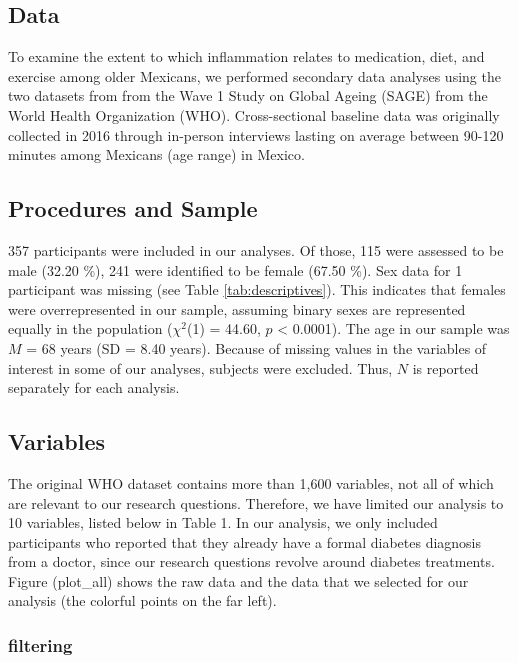 \documentclass[
  man]{apa6}
\begin{document}
\hypertarget{data}{%
\subsection{Data}\label{data}}

To examine the extent to which inflammation relates to medication, diet, and exercise among older Mexicans, we performed secondary data analyses using the two datasets from from the Wave 1 Study on Global Ageing (SAGE) from the World Health Organization (WHO). Cross-sectional baseline data was originally collected in 2016 through in-person interviews lasting on average between 90-120 minutes among Mexicans (age range) in Mexico.

\hypertarget{procedures-and-sample}{%
\subsection{Procedures and Sample}\label{procedures-and-sample}}

357 participants were included in our analyses. Of those, 115 were assessed to be male (32.20 \%), 241 were identified to be female (67.50 \%). Sex data for 1 participant was missing (see Table \ref{tab:descriptives}). This indicates that females were overrepresented in our sample, assuming binary sexes are represented equally in the population (\(\chi^2\)(1) = 44.60, \(p\) \textless{} 0.0001). The age in our sample was \(M\) = 68 years (SD = 8.40 years).
Because of missing values in the variables of interest in some of our analyses, subjects were excluded. Thus, \(N\) is reported separately for each analysis.

\hypertarget{variables}{%
\subsection{Variables}\label{variables}}

The original WHO dataset contains more than 1,600 variables, not all of which are relevant to our research questions. Therefore, we have limited our analysis to 10 variables, listed below in Table 1. In our analysis, we only included participants who reported that they already have a formal diabetes diagnosis from a doctor, since our research questions revolve around diabetes treatments. Figure (plot\_all) shows the raw data and the data that we selected for our analysis (the colorful points on the far left).

\hypertarget{filtering}{%
\subsubsection{filtering}\label{filtering}}
\end{document}
